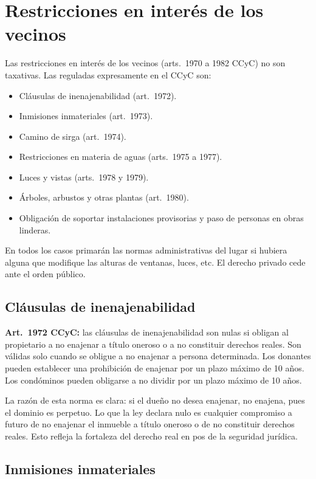 \documentclass[12pt,oneside]{book}
\begin{document}
\section{Restricciones en interés de los vecinos}

Las restricciones en interés de los vecinos (arts.~1970 a 1982 CCyC) no son taxativas. Las reguladas expresamente en el CCyC son:

\begin{itemize}
    \item Cláusulas de inenajenabilidad (art.~1972).
    \item Inmisiones inmateriales (art.~1973).
    \item Camino de sirga (art.~1974).
    \item Restricciones en materia de aguas (arts.~1975 a 1977).
    \item Luces y vistas (arts.~1978 y 1979).
    \item Árboles, arbustos y otras plantas (art.~1980).
    \item Obligación de soportar instalaciones provisorias y paso de personas en obras linderas.
\end{itemize}

En todos los casos primarán las normas administrativas del lugar si hubiera alguna que modifique las alturas de ventanas, luces, etc. El derecho privado cede ante el orden público.

\subsection{Cláusulas de inenajenabilidad}

\textbf{Art.~1972 CCyC:} las cláusulas de inenajenabilidad son nulas si obligan al propietario a no enajenar a título oneroso o a no constituir derechos reales. Son válidas solo cuando se obligue a no enajenar a persona determinada. Los donantes pueden establecer una prohibición de enajenar por un plazo máximo de 10 años. Los condóminos pueden obligarse a no dividir por un plazo máximo de 10 años.

La razón de esta norma es clara: si el dueño no desea enajenar, no enajena, pues el dominio es perpetuo. Lo que la ley declara nulo es cualquier compromiso a futuro de no enajenar el inmueble a título oneroso o de no constituir derechos reales. Esto refleja la fortaleza del derecho real en pos de la seguridad jurídica.

\subsection{Inmisiones inmateriales}
\end{document}
